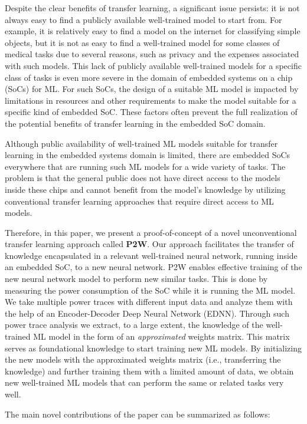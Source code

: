\documentclass[letterpaper]{article}
\begin{document}
Despite the clear benefits of transfer learning, a significant issue persists: it is not always easy to find a publicly available well-trained model to start from. For example, it is relatively easy to find a model on the internet for classifying simple objects, but it is not as easy to find a well-trained model for some classes of medical tasks due to several reasons, such as privacy and the expenses associated with such models. This lack of publicly available well-trained models for a specific class of tasks is even more severe in the domain of embedded systems on a chip (SoCs) for ML. For such SoCs, the design of a suitable ML model is impacted by limitations in resources and other requirements to make the model suitable for a specific kind of embedded SoC. These factors often prevent the full realization of the potential benefits of transfer learning in the embedded SoC domain.

Although public availability of well-trained ML models suitable for transfer learning in the embedded systems domain is limited, there are embedded SoCs everywhere that are running such ML models for a wide variety of tasks. The problem is that the general public does not have direct access to the models inside these chips and cannot benefit from the model's knowledge by utilizing conventional transfer learning approaches that require direct access to ML models. 

Therefore, in this paper, we present a proof-of-concept of a novel unconventional transfer learning approach called \textbf{P2W}. Our approach facilitates the transfer of knowledge encapsulated in a relevant well-trained neural network, running inside an embedded SoC, to a new neural network. P2W enables effective training of the new neural network model to perform new similar tasks. This is done by measuring the power consumption of the SoC while it is running the ML model. We take multiple power traces with different input data and analyze them with the help of an Encoder-Decoder Deep Neural Network (EDNN).
Through such power trace analysis we extract, to a large extent, the knowledge of the well-trained ML model in the form of an \emph{approximated} weights matrix. This matrix serves as foundational knowledge to start training new ML models. By initializing the new models with the approximated weights matrix (i.e., transferring the knowledge) and further training them with a limited amount of data, we obtain new well-trained ML models that can perform the same or related tasks very well.

The main novel contributions of the paper can be summarized as follows:
\end{document}
